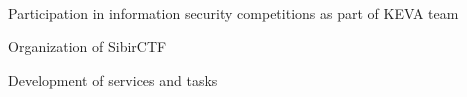 \documentclass[a4paper]{MagicalCV}
\begin{document}
\begin{minipage}[t]{0.66\textwidth}

 \\
\vspace{\topsep} %
\begin{tightemize}
  \item Participation in information security competitions as part of KEVA team
  \item Organization of SibirCTF
  \item Development of services and tasks
\end{tightemize}
\sectionsep

\end{minipage} 
\end{document}
